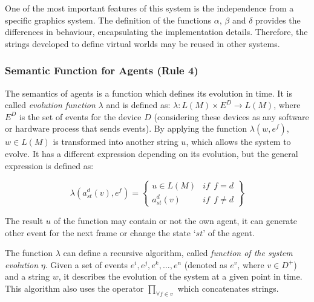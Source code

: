 \documentclass[runningheads]{llncs}
\begin{document}
One of the most important features of this system is the independence from a specific graphics
system. The definition of the functions $\alpha$, $\beta$ and $\delta$ provides the differences in
behaviour, encapsulating the implementation details. Therefore, the strings developed to define
virtual worlds may be reused in other systems.



\subsubsection{Semantic Function for Agents (Rule 4)
\label{sec:rule4}}

The semantics of agents is a function which defines its evolution in time. It is called
\textit{evolution function} $\lambda$ and is defined as:
$\lambda: L(M) \times E^D \rightarrow L(M)$, where $E^D$ is the set of events
for the device $D$ (considering these devices as
any software or hardware process that sends events). By applying the function
$\lambda(w, e^{f})$, $w \in L(M)$ is transformed into another string $u$,
which allows the system to evolve. It has a different expression depending on
its evolution, but the general expression is defined as:

\begin{small}
\begin{equation}
    \lambda (a_{st}^{d}(v),e^{f})=
    \left\{
    \begin{array}{ll}
        u \in L(M) & \mathit{if}  \ \ f = d \\
        a_{st}^{d}(v)  & \mathit{if}  \ \ f \neq d
    \end{array}\right\}
\end{equation}
\end{small}

The result $u$ of the function may contain or not the own agent, it can generate other
event for the next frame or change the state `$st$' of the agent.

The function $\lambda$ can define a recursive algorithm, called
\textit{function of the system evolution} $\eta$. Given a set of
events $e^i, e^j, e^k, \dots, e^n$ (denoted as $e^v$, where $v \in D^+$)
and a string $w$, it describes the evolution of the system at a given point
in time. This algorithm also uses the operator $\prod_{\forall f \in v}$ which concatenates
strings.
\end{document}
